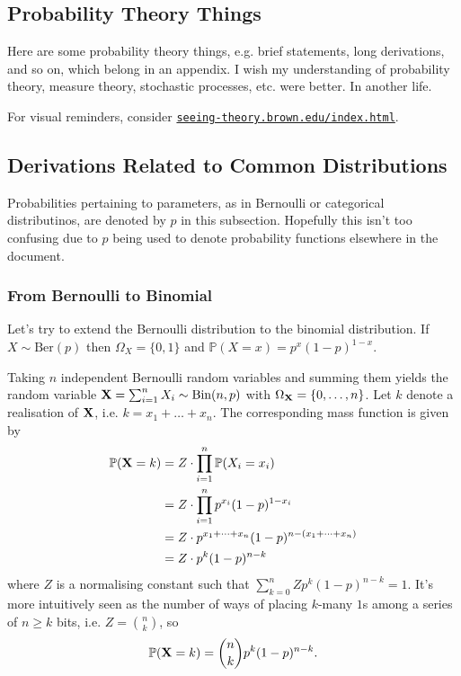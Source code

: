 \documentclass[11pt]{article}
\begin{document}
\newpage
\begin{appendices}

\section{Probability Theory Things}
Here are some probability theory things, e.g. brief statements, long derivations, and so on, which belong in an appendix. I wish my understanding of probability theory, measure theory, stochastic processes, etc. were better. In another life.

For visual reminders, consider \href{https://seeing-theory.brown.edu/index.html}{\texttt{seeing-theory.brown.edu/index.html}}.

\subsection{Derivations Related to Common Distributions}
Probabilities pertaining to parameters, as in Bernoulli or categorical distributinos, are denoted by $p$ in this subsection. Hopefully this isn't too confusing due to $p$ being used to denote probability functions elsewhere in the document.

\subsubsection{From Bernoulli to Binomial}
Let's try to extend the Bernoulli distribution to the binomial distribution. If $X\sim\text{Ber}(p)$ then $\Omega_X=\{0,1\}$ and $\mathbb{P}(X=x)=p^x(1-p)^{1-x}$.

Taking $n$ independent Bernoulli random variables and summing them yields the random variable $\mathbf{X}=\sum_{i=1}^nX_i\sim\text{Bin}(n,p)$ with $\Omega_{\mathbf{X}}=\{0,\dots,n\}$. Let $k$ denote a realisation of $\mathbf{X}$, i.e. $k=x_1+\dots+x_n$. The corresponding mass function is given by
\begin{align*}
    \mathbb{P}(\mathbf{X}=k)
    &=
    Z\cdot\prod_{i=1}^n\mathbb{P}(X_i=x_i)\\
    &=
    Z\cdot\prod_{i=1}^np^{x_i}(1-p)^{1-x_i}\\
    &=
    Z\cdot p^{x_1+\dots+x_n}(1-p)^{n-(x_1+\dots+x_n)}\\
    &=
    Z\cdot p^k(1-p)^{n-k}
\end{align*}
where $Z$ is a normalising constant such that $\sum_{k=0}^nZp^k(1-p)^{n-k}=1$. It's more intuitively seen as the number of ways of placing $k$-many $1$s among a series of $n\geq k$ bits, i.e. $Z=\binom{n}{k}$, so
$$
\mathbb{P}(\mathbf{X}=k)
=
\binom{n}{k}p^k(1-p)^{n-k}.
$$


\end{appendices}
\end{document}
